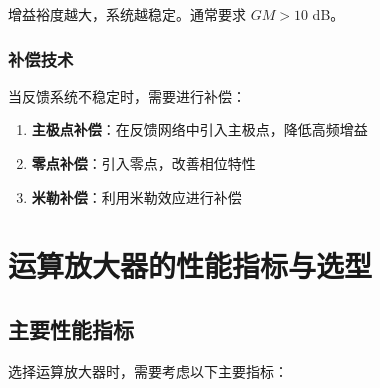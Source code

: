 增益裕度越大，系统越稳定。通常要求 $GM > 10$ dB。

\subsubsection{补偿技术}

当反馈系统不稳定时，需要进行补偿：

\begin{enumerate}
  \item \textbf{主极点补偿}：在反馈网络中引入主极点，降低高频增益
  \item \textbf{零点补偿}：引入零点，改善相位特性
  \item \textbf{米勒补偿}：利用米勒效应进行补偿
\end{enumerate}

\section{运算放大器的性能指标与选型}

\subsection{主要性能指标}

选择运算放大器时，需要考虑以下主要指标：

